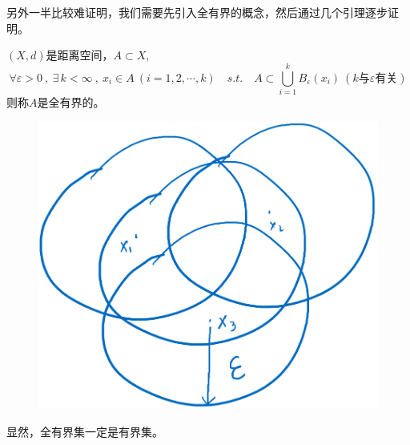 另外一半比较难证明，我们需要先引入全有界的概念，然后通过几个引理逐步证明。
\begin{definition}[全有界性]
    $(X,d)$是距离空间，$A \subset X$,
    \[\forall \varepsilon>0 \ , \ \exists \, k<\infty \ , \ x_i \in A \ (i=1,2,\cdots,k) \quad s.t. \quad A \subset \bigcup_{i=1}^kB_{\varepsilon}(x_i) \ (k\text{与$\varepsilon$有关})\]
    则称$A$是全有界的。
\end{definition}
\begin{figure}[htbp]
    \center
    \includegraphics[scale=0.25]{./fig/2.2.3.png}
\end{figure}
显然，全有界集一定是有界集。
